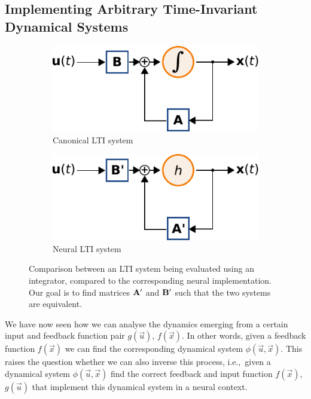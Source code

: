 \documentclass[10pt,letterpaper,oneside]{article}
\begin{document}
\subsection{Implementing Arbitrary Time-Invariant Dynamical Systems}

\begin{figure}
	\centering%
	\begin{subfigure}{0.5\textwidth}%
		\centering%
		\includegraphics{media/lti_integrator_vs_neural_a.pdf}%
		\caption{Canonical LTI system}%
		\label{fig:lti_integrator_vs_neural_a}%
	\end{subfigure}%
	\begin{subfigure}{0.5\textwidth}%
		\centering%
		\includegraphics{media/lti_integrator_vs_neural_b.pdf}%
		\caption{Neural LTI system}%
		\label{fig:lti_integrator_vs_neural_b}%
	\end{subfigure}
	\caption{Comparison between an LTI system being evaluated using an integrator, compared to the corresponding neural implementation. Our goal is to find matrices ${\mathbf{A}}'$ and ${\mathbf{B}}'$ such that the two systems are equivalent.}
\end{figure}

We have now seen how we can analyse the dynamics emerging from a certain input and feedback function pair $g(\vec u)$, $f(\vec x)$. In other words, given a feedback function $f(\vec x)$ we can find the corresponding dynamical system $\phi(\vec u, \vec x)$. This raises the question whether we can also inverse this process, i.e.,~given a dynamical system $\phi(\vec u, \vec x)$ find the correct feedback and input function $f(\vec x)$, $g(\vec u)$ that implement this dynamical system in a neural context.
\end{document}
